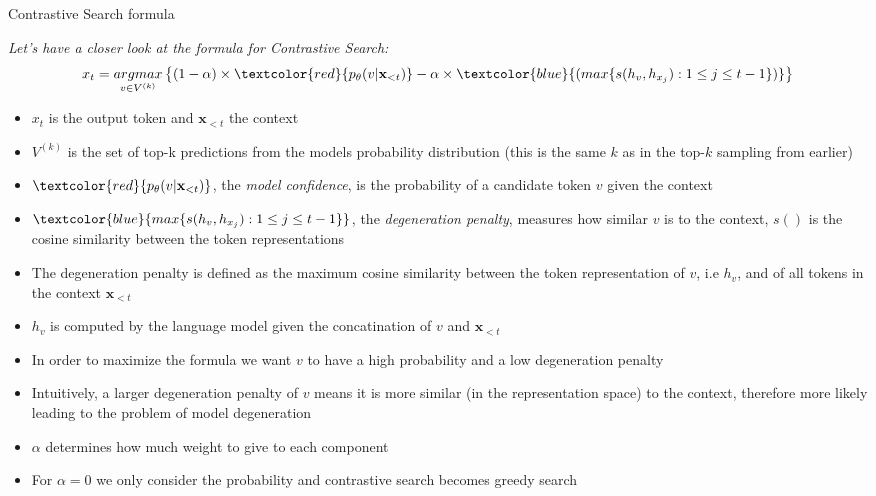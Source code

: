 \documentclass[11pt,compress,t,notes=noshow, xcolor=table]{beamer}
\begin{document}
\begin{vbframe}{Contrastive Search formula}


\textit{Let's have a closer look at the formula for Contrastive Search:}
\small
$$x_t = \underset{v \in V^{(k)}}{argmax}\left\{(1 - \alpha) \times \textcolor{red}{p_\theta(v|\mathbf{x}_{<t})} - \alpha \times \textcolor{blue}{(max\{s(h_v,h_{x_j}):1\leq j \leq t-1\})}\right\}$$

\begin{itemize}
    \item $x_t$ is the output token and $\mathbf{x}_{<t}$ the context
    \item $V^{(k)}$ is the set of top-k predictions from the models probability distribution (this is the same $k$ as in the top-$k$ sampling from earlier)
    \item $\textcolor{red}{p_\theta(v|\mathbf{x}_{<t})}$, the \textit{model confidence}, is the probability of a candidate token $v$ given the context
    \item $\textcolor{blue}{max\{s(h_v,h_{x_j}):1\leq j \leq t-1\}}$, the \textit{degeneration penalty}, measures how similar $v$ is to the context, $s()$ is the cosine similarity between the token representations
    \item The degeneration penalty is defined as the maximum cosine similarity between the token representation of $v$, i.e $h_v$, and of all tokens in the context $\mathbf{x}_{<t}$
    \item $h_v$ is computed by the language model given the concatination of $v$ and $\mathbf{x}_{<t}$
    \item In order to maximize the formula we want $v$ to have a high probability and a low degeneration penalty
    \item Intuitively, a larger degeneration penalty of $v$ means it is more similar (in the representation space) to the context, therefore more likely leading to the problem of model degeneration
    \item $\alpha$ determines how much weight to give to each component
    \item For $\alpha = 0$ we only consider the probability and contrastive search becomes greedy search
\end{itemize}

\vfill

\end{vbframe}
\end{document}
